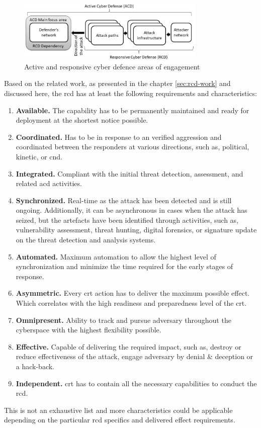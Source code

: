 \begin{figure}[!htb]
    \centering
    \includegraphics[width=0.8\textwidth]{./img/acd-rcd.jpg}
    \caption{Active and responsive cyber defence areas of engagement}
    \label{fig:acdrcd}
\end{figure}

Based on the related work, as presented in the chapter \ref{sec:rcd-work} and discussed here, the \gls{rcd} has at least the following requirements and characteristics:
\begin{enumerate}
    \item \textbf{Available.} The capability has to be permanently maintained and ready for deployment at the shortest notice possible.
    \item \textbf{Coordinated.} Has to be in response to an verified aggression and coordinated between the responders at various directions, such as, political, kinetic, or \gls{cnd}.
    \item \textbf{Integrated.} Compliant with the initial threat detection, assessment, and related \gls{acd} activities.
    \item \textbf{Synchronized.} Real-time as the attack has been detected and is still ongoing. Additionally, it can be asynchronous in cases when the attack has seized, but the artefacts have been identified through activities, such as, vulnerability assessment, threat hunting, digital forensics, or signature update on the threat detection and analysis systems.
    \item \textbf{Automated.} Maximum automation to allow the highest level of synchronization and minimize the time required for the early stages of response.
    \item \textbf{Asymmetric.} Every \gls{crt} action has to deliver the maximum possible effect. Which correlates with the high readiness and preparedness level of the \gls{crt}.
    \item \textbf{Omnipresent.} Ability to track and pursue adversary throughout the cyberspace with the highest flexibility possible.
    \item \textbf{Effective.} Capable of delivering the required impact, such as, destroy or reduce effectiveness of the attack, engage adversary by denial \& deception or a hack-back.
    \item \textbf{Independent.} \gls{crt} has to contain all the necessary capabilities to conduct the \gls{rcd}.
\end{enumerate}
This is not an exhaustive list and more characteristics could be applicable depending on the particular \gls{rcd} specifics and delivered effect requirements.
